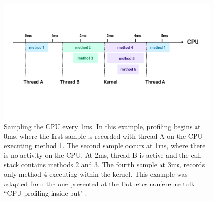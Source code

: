 \begin{figure}[!h]
    \includegraphics[width=\linewidth]{report-a_sampling_timeline}
    \caption{Sampling the CPU every 1ms. In this example, profiling begins at 0ms, where the first sample is recorded with thread A on the CPU executing method 1. The second sample occurs at 1ms, where there is no activity on the CPU. At 2ms, thread B is active and the call stack contains methods 2 and 3. The fourth sample at 3ms, records only method 4 executing within the kernel. This example was adapted from the one presented at the Dotnetos conference talk ``CPU profiling inside out" \cite{YouTubeDotnetosCPUProfling}.}
    \label{fig:sel4_microkernel}
\end{figure}

